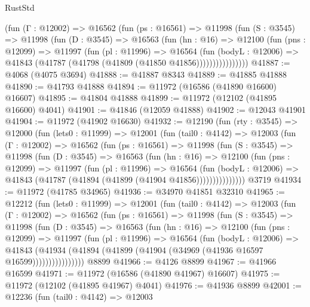 \begin{lexlean}{RustStd}
\begin{coremodule}
            (fun (Γ : @12002) =>
            @16562
              (fun (ps : @16561) =>
              @11998
                (fun (S : @3545) =>
                @11998
                  (fun (D : @3545) =>
                  @16563
                    (fun (hn : @16) =>
                    @12100
                      (fun (pns : @12099) =>
                      @11997
                        (fun (pl : @11996) =>
                        @16564
                          (fun (bodyL : @12006) =>
                          @41843 (@41787 (@41798 (@41809 (@41850 @41856))))))))))))))))
@41887 := @4068 (@4075 @3694)
@41888 := @41887 @8343
@41889 := @41885 @41888
@41890 := @41793 @41888
@41894 := @11972 (@16586 (@41890 @16600) @16607)
@41895 := @41804 @41888
@41899 := @11972 (@12102 (@41895 @16600) @4041)
@41901 := @41846 (@12059 @41888)
@41902 := @12043 @41901
@41904 := @11972 (@41902 @16630)
@41932 := @12190
    (fun (rty : @3545) =>
    @12000
      (fun (lets0 : @11999) =>
      @12001
        (fun (tail0 : @4142) =>
        @12003
          (fun (Γ : @12002) =>
          @16562
            (fun (ps : @16561) =>
            @11998
              (fun (S : @3545) =>
              @11998
                (fun (D : @3545) =>
                @16563
                  (fun (hn : @16) =>
                  @12100
                    (fun (pns : @12099) =>
                    @11997
                      (fun (pl : @11996) =>
                      @16564
                        (fun (bodyL : @12006) =>
                        @41843 (@41787 (@41894 (@41899 (@41904 @41856)))))))))))))))
    @3719
@41934 := @11972 (@41785 @34965)
@41936 := @34970 @41851 @32310
@41965 := @12212
    (fun (lets0 : @11999) =>
    @12001
      (fun (tail0 : @4142) =>
      @12003
        (fun (Γ : @12002) =>
        @16562
          (fun (ps : @16561) =>
          @11998
            (fun (S : @3545) =>
            @11998
              (fun (D : @3545) =>
              @16563
                (fun (hn : @16) =>
                @12100
                  (fun (pns : @12099) =>
                  @11997
                    (fun (pl : @11996) =>
                    @16564
                      (fun (bodyL : @12006) =>
                      @41843
                        (@41934
                          (@41894 (@41899 (@41904 (@34969 (@41936 @16597 @16599))))))))))))))))
    @8899
@41966 := @4126 @8899
@41967 := @41966 @16599
@41971 := @11972 (@16586 (@41890 @41967) @16607)
@41975 := @11972 (@12102 (@41895 @41967) @4041)
@41976 := @41936 @8899
@42001 := @12236
    (fun (tail0 : @4142) =>
    @12003

\end{coremodule}
\end{lexlean}
